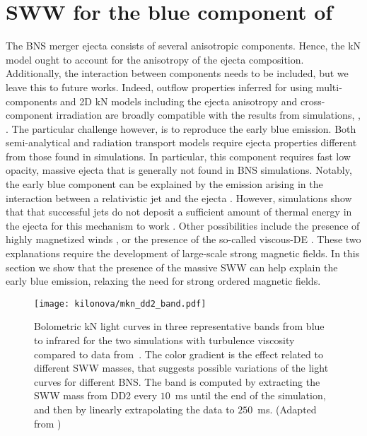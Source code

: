 \section{\ac{SWW} for the blue component of \AT{}}

The \ac{BNS} merger ejecta consists of several anisotropic components.
Hence, the \ac{kN} model ought to account for the anisotropy of the ejecta composition. Additionally, the interaction between components needs to be included, but we leave this to future works.
Indeed, outflow properties inferred for \AT{} using multi-components and 2D \ac{kN} models including the ejecta anisotropy and cross-component irradiation are broadly compatible with the results from simulations, \eg, \citep{Perego:2017wtu,Kawaguchi:2018ptg}.
The particular challenge however, is to reproduce the early blue emission. 
Both semi-analytical and radiation transport
models require ejecta properties different from those found in
simulations. In particular, 
this component requires fast low opacity, massive ejecta \citep{Fahlman:2018llv} that is generally 
not found in \ac{BNS} simulations.
Notably, the early blue component can be explained by the emission arising 
in the interaction between a relativistic jet and the ejecta
\citep{Lazzati:2016yxl,Bromberg:2017crh,Piro:2017ayh}.
However, simulations show that that successful jets do not deposit a sufficient amount of thermal energy in the ejecta for this mechanism to work \citep{Duffell:2018iig}. 
Other possibilities include the presence of highly magnetized winds \citep{Metzger:2018uni,Fernandez:2018kax},
or the presence of the so-called viscous-\ac{DE} \citep{Radice:2018ghv}.
These two explanations require the development of large-scale strong magnetic fields.
In this section we show that the presence of the massive \ac{SWW} can help explain the early blue emission, relaxing the need for strong ordered magnetic fields. 

\begin{figure}[t]
    \centering
    \texttt{[image: kilonova/mkn\_dd2\_band.pdf]}
    \caption{Bolometric kN light curves in three representative bands from blue to
        infrared for the two simulations with turbulence viscosity compared to
        \AT{} data from~\citep{Villar:2017wcc}.
        The color gradient is the effect related to different
        \ac{SWW} masses, that suggests possible variations of the light
        curves for different \ac{BNS}. The band is computed by extracting the
        \ac{SWW} mass from DD2 every $10$~ms until the end of the simulation, and
        then by linearly extrapolating the data to $250$~ms.
        (Adapted from \citet{Nedora:2019jhl})
    }
    \label{fig:knlc}
\end{figure}

